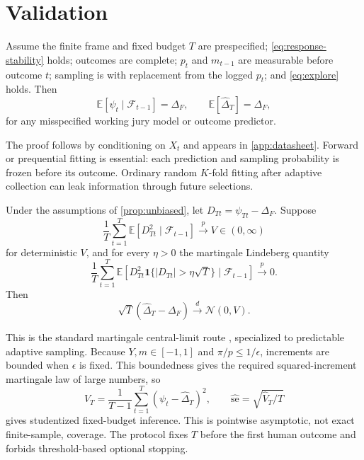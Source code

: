 \documentclass{article}
\begin{document}
\section{Validation}
\label{sec:validation}

\begin{proposition}
\label{prop:unbiased}
Assume the finite frame and fixed budget $T$ are prespecified;
\cref{eq:response-stability} holds; outcomes are complete; $p_t$ and
$m_{t-1}$ are measurable before outcome $t$; sampling is with replacement from
the logged $p_t$; and \cref{eq:explore} holds. Then
\begin{equation}
\mathbb E[\psi_t\mid\mathcal F_{t-1}]=\Delta_F,\qquad
\mathbb E[\widehat\Delta_T]=\Delta_F,
\end{equation}
for any misspecified working jury model or outcome predictor.
\end{proposition}

The proof follows by conditioning on $X_t$ and appears in
\cref{app:datasheet}. Forward or prequential fitting is essential: each
prediction and sampling probability is frozen before its outcome. Ordinary
random $K$-fold fitting after adaptive collection can leak information through
future selections.

\begin{theorem}
\label{thm:clt}
Under the assumptions of \cref{prop:unbiased}, let
$D_{Tt}=\psi_{Tt}-\Delta_F$. Suppose
\begin{equation}
\frac1T\sum_{t=1}^T
\mathbb E[D_{Tt}^2\mid\mathcal F_{t-1}]
\xrightarrow{p}V\in(0,\infty)
\end{equation}
for deterministic $V$, and for every $\eta>0$ the martingale Lindeberg
quantity
\begin{equation}
\frac1T\sum_{t=1}^T
\mathbb E[D_{Tt}^2\mathbf 1\{|D_{Tt}|>\eta\sqrt T\}
\mid\mathcal F_{t-1}]
\xrightarrow{p}0.
\end{equation}
Then
\begin{equation}
\sqrt T(\widehat\Delta_T-\Delta_F)
\overset{d}{\longrightarrow}\mathcal N(0,V).
\end{equation}
\end{theorem}

This is the standard martingale central-limit route
\cite{hall1980martingale}, specialized to predictable adaptive sampling.
Because $Y,m\in[-1,1]$ and $\pi/p\le1/\epsilon$, increments are bounded when
$\epsilon$ is fixed. This boundedness gives the required squared-increment
martingale law of large numbers, so
\begin{equation}
\widehat V_T=\frac1{T-1}\sum_{t=1}^T
(\psi_t-\widehat\Delta_T)^2,\qquad
\widehat{\mathrm{se}}=\sqrt{\widehat V_T/T}
\end{equation}
gives studentized fixed-budget inference. This is pointwise asymptotic, not
exact finite-sample, coverage. The protocol fixes $T$ before the first human
outcome and forbids threshold-based optional stopping.
\end{document}
